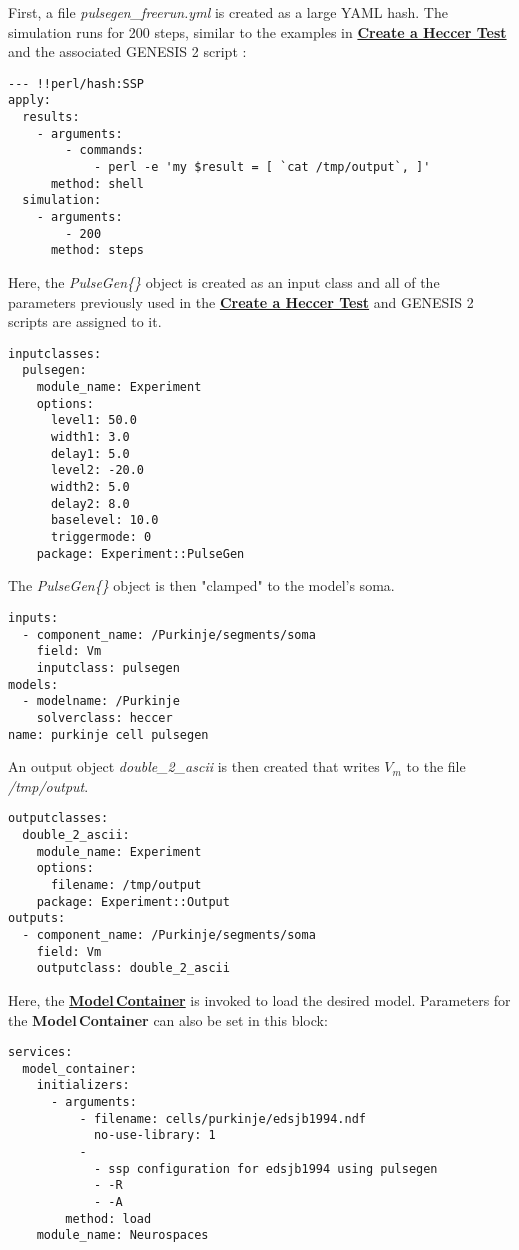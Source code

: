 \documentclass[12pt]{article}
\begin{document}
First, a file {\it pulsegen\_freerun.yml} is created as a large YAML hash. The simulation runs for 200 steps, similar to the examples in \href{../genesis-create-test-heccer/genesis-create-test-heccer.tex}{\bf Create a Heccer Test} and the associated GENESIS 2 script :
\begin{verbatim}
--- !!perl/hash:SSP
apply:
  results:
    - arguments:
        - commands:
            - perl -e 'my $result = [ `cat /tmp/output`, ]'
      method: shell
  simulation:
    - arguments:
        - 200
      method: steps
\end{verbatim}
Here, the {\it PulseGen\{\}} object is created as an input class and all of the parameters previously used in the \href{../genesis-create-test-heccer/genesis-create-test-heccer.tex}{\bf Create a Heccer Test} and GENESIS 2 scripts are assigned to it.
\begin{verbatim}
inputclasses:
  pulsegen:
    module_name: Experiment
    options:
      level1: 50.0
      width1: 3.0
      delay1: 5.0
      level2: -20.0
      width2: 5.0
      delay2: 8.0
      baselevel: 10.0
      triggermode: 0
    package: Experiment::PulseGen
\end{verbatim}
The  {\it PulseGen\{\}} object is then "clamped" to the model's soma.
\begin{verbatim}
inputs:
  - component_name: /Purkinje/segments/soma
    field: Vm
    inputclass: pulsegen
models:
  - modelname: /Purkinje
    solverclass: heccer
name: purkinje cell pulsegen
\end{verbatim}
An output object {\it double\_2\_ascii} is then created that writes $V_m$ to the file {\it /tmp/output}.
\begin{verbatim}
outputclasses:
  double_2_ascii:
    module_name: Experiment
    options:
      filename: /tmp/output
    package: Experiment::Output
outputs:
  - component_name: /Purkinje/segments/soma
    field: Vm
    outputclass: double_2_ascii
\end{verbatim}
Here, the \href{../model-container/model-container.tex}{\bf Model\,Container} is invoked to load the desired model. Parameters for the {\bf Model\,Container} can also be set in this block:
\begin{verbatim}
services:
  model_container:
    initializers:
      - arguments:
          - filename: cells/purkinje/edsjb1994.ndf
            no-use-library: 1
          -
            - ssp configuration for edsjb1994 using pulsegen
            - -R
            - -A
        method: load
    module_name: Neurospaces
\end{verbatim}
\end{document}
